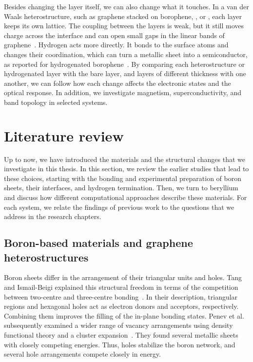 Besides changing the layer itself, we can also change what it touches.
In a van der Waals heterostructure, such as graphene stacked on borophene, , or , each layer keeps its own lattice.
The coupling between the layers is weak, but it still moves charge across the interface and can open small gaps in the linear bands of graphene~\cite{novoselov20162d}.
Hydrogen acts more directly.
It bonds to the surface atoms and changes their coordination, which can turn a metallic sheet into a semiconductor, as reported for hydrogenated borophene~\cite{hou2020ultrastable}.
By comparing each heterostructure or hydrogenated layer with the bare layer, and layers of different thickness with one another, we can follow how each change affects the electronic states and the optical response.
In addition, we investigate magnetism, superconductivity, and band topology in selected systems.

\FloatBarrier
\section{Literature review}
\label{sec:intro_lit_review}

Up to now, we have introduced the materials and the structural changes that we investigate in this thesis.
In this section, we review the earlier studies that lead to these choices, starting with the bonding and experimental preparation of boron sheets, their interfaces, and hydrogen termination.
Then, we turn to beryllium and discuss how different computational approaches describe these materials.
For each system, we relate the findings of previous work to the questions that we address in the research chapters.

\FloatBarrier
\subsection{Boron-based materials and graphene heterostructures}
\label{subsec:lit_boron}

Boron sheets differ in the arrangement of their triangular units and holes.
Tang and Ismail-Beigi explained this structural freedom in terms of the competition between two-centre and three-centre bonding~\cite{tang2007novel}.
In their description, triangular regions and hexagonal holes act as electron donors and acceptors, respectively.
Combining them improves the filling of the in-plane bonding states.
Penev et al. subsequently examined a wider range of vacancy arrangements using density functional theory and a cluster expansion~\cite{penev2012polymorphism}.
They found several metallic sheets with closely competing energies.
Thus, holes stabilize the boron network,
and several hole arrangements compete closely in energy.

